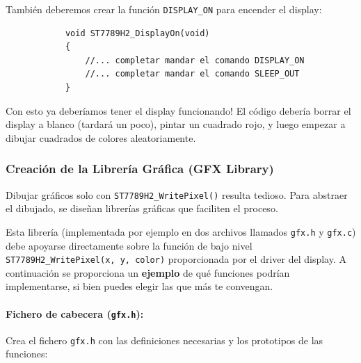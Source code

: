 \documentclass[../main.tex]{subfiles}
\begin{document}
        También deberemos crear la función \texttt{DISPLAY\_ON} para encender el display:

        \begin{lstlisting}
            void ST7789H2_DisplayOn(void)
            {
                //... completar mandar el comando DISPLAY_ON
                //... completar mandar el comando SLEEP_OUT
            }
        \end{lstlisting}

        Con esto ya deberíamos tener el display funcionando! El código debería borrar el display a blanco (tardará un poco), pintar un cuadrado rojo, y luego empezar a dibujar cuadrados de colores aleatoriamente.

        \subsubsection{Creación de la Librería Gráfica (GFX Library)}

            Dibujar gráficos solo con \texttt{ST7789H2\_WritePixel()} resulta tedioso. Para abstraer el dibujado, se diseñan librerías gráficas que faciliten el proceso. 

            Esta librería (implementada por ejemplo en dos archivos llamados \texttt{gfx.h} y \texttt{gfx.c}) debe apoyarse directamente sobre la función de bajo nivel \texttt{ST7789H2\_WritePixel(x, y, color)} proporcionada por el driver del display. A continuación se proporciona un \textbf{ejemplo} de qué funciones podrían implementarse, si bien puedes elegir las que más te convengan.

            \paragraph{Fichero de cabecera (\texttt{gfx.h}):}
            Crea el fichero \texttt{gfx.h} con las definiciones necesarias y los prototipos de las funciones:
\end{document}
